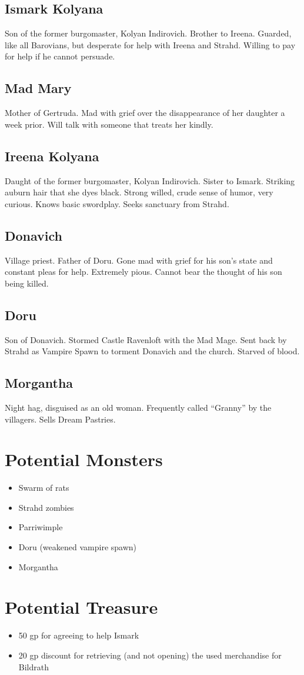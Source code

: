 \documentclass[a4paper,11pt]{article}
\begin{document}
\subsection{Ismark Kolyana}
  Son of the former burgomaster, Kolyan Indirovich. Brother to Ireena. Guarded, like all Barovians, but 
  desperate for help with Ireena and Strahd. Willing to pay for help if he cannot persuade.
\subsection{Mad Mary}
  Mother of Gertruda. Mad with grief over the disappearance of her daughter a week prior. Will talk with someone
  that treats her kindly.
\subsection{Ireena Kolyana}
  Daught of the former burgomaster, Kolyan Indirovich. Sister to Ismark. Striking auburn hair that she dyes 
  black. Strong willed, crude sense of humor, very curious. Knows basic swordplay. Seeks sanctuary from Strahd.
\subsection{Donavich}
  Village priest. Father of Doru. Gone mad with grief for his son's state and constant pleas for help. Extremely
  pious. Cannot bear the thought of his son being killed.
\subsection{Doru}
  Son of Donavich. Stormed Castle Ravenloft with the Mad Mage. Sent back by Strahd as Vampire Spawn to torment
  Donavich and the church. Starved of blood.
\subsection{Morgantha}
  Night hag, disguised as an old woman. Frequently called ``Granny'' by the villagers. Sells Dream Pastries.


\section{Potential Monsters}
\label{sec:PotentialMonsters}
\begin{itemize}
  \item Swarm of rats
  \item Strahd zombies
  \item Parriwimple
  \item Doru (weakened vampire spawn)
  \item Morgantha
\end{itemize}


\section{Potential Treasure}
\label{sec:PotentialTreasure}
\begin{itemize}
  \item 50 gp for agreeing to help Ismark
  \item 20 gp discount for retrieving (and not opening) the used merchandise for Bildrath
\end{itemize}
\end{document}
